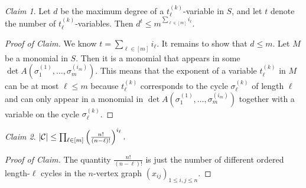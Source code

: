 \documentclass[10pt,a4paper]{article}
\theoremstyle{definition}
\theoremstyle{plain}
\theoremstyle{remark}
\newtheorem{claim}{Claim}[definition]
\newenvironment{claimproof}[1][Proof of Claim]{\begin{proof}[#1] \renewcommand{\qedsymbol}{$\lrcorner$}}{ \end{proof}}
\newcommand{\Cc}{{\cal C}}
\begin{document}
\begin{claim}\label{imm:claim2} Let $d$ be the maximum degree of a $t_\ell^{(k)}$-variable in $S$, and let $t$ denote the number of $t_\ell^{(k)}$-variables. Then $d^t \leq m^{\sum_{\ell \in [m]} i_\ell}$.
\end{claim}
\begin{claimproof}
We know $t = \sum_{\ell \in [m]} i_\ell$. It remains to show that $d \leq m$.
Let $M$ be a monomial in $S$. Then it is a monomial that appears in some $\det A(\sigma_1^{(1)},\dots ,\sigma_{m}^{(i_m)})$.
This means that the exponent of a variable $t_\ell^{(k)}$ in $M$ can be at most $\ell \leq m$ because $t_\ell^{(k)}$ corresponds to the cycle $\sigma_\ell^{(k)}$ of length $\ell$ and can only appear in a monomial in $\det A(\sigma_1^{(1)},\dots ,\sigma_{m}^{(i_m)})$ together with a variable on the cycle $\sigma_\ell^{(k)}$.
\end{claimproof}
\begin{claim}\label{imm:claim3}
\(
|\Cc| \leq \prod_{\ell \in [m]} \left(\frac{n!}{(n-\ell)!} \right)^{i_\ell}.
\)
\end{claim}
\begin{claimproof} The quantity $\frac{n!}{(n-\ell)!}$ is just the number of different ordered length-$\ell$ cycles in the $n$-vertex graph $(x_{ij})_{1 \leq i,j \leq n}$.
\end{claimproof}
\end{document}
